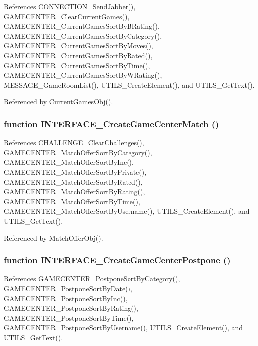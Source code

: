 References CONNECTION\_\-SendJabber(), GAMECENTER\_\-ClearCurrentGames(), GAMECENTER\_\-CurrentGamesSortByBRating(), GAMECENTER\_\-CurrentGamesSortByCategory(), GAMECENTER\_\-CurrentGamesSortByMoves(), GAMECENTER\_\-CurrentGamesSortByRated(), GAMECENTER\_\-CurrentGamesSortByTime(), GAMECENTER\_\-CurrentGamesSortByWRating(), MESSAGE\_\-GameRoomList(), UTILS\_\-CreateElement(), and UTILS\_\-GetText().

Referenced by CurrentGamesObj().
\subsubsection[INTERFACE\_\-CreateGameCenterMatch]{\setlength{\rightskip}{0pt plus 5cm}function INTERFACE\_\-CreateGameCenterMatch ()}\label{interface_2gamecenter_8js_cd46b547d2069b8e99477be9599a0fbb}




References CHALLENGE\_\-ClearChallenges(), GAMECENTER\_\-MatchOfferSortByCategory(), GAMECENTER\_\-MatchOfferSortByInc(), GAMECENTER\_\-MatchOfferSortByPrivate(), GAMECENTER\_\-MatchOfferSortByRated(), GAMECENTER\_\-MatchOfferSortByRating(), GAMECENTER\_\-MatchOfferSortByTime(), GAMECENTER\_\-MatchOfferSortByUsername(), UTILS\_\-CreateElement(), and UTILS\_\-GetText().

Referenced by MatchOfferObj().
\subsubsection[INTERFACE\_\-CreateGameCenterPostpone]{\setlength{\rightskip}{0pt plus 5cm}function INTERFACE\_\-CreateGameCenterPostpone ()}\label{interface_2gamecenter_8js_12adac32e00e7303d9be30b584ba6e70}




References GAMECENTER\_\-PostponeSortByCategory(), GAMECENTER\_\-PostponeSortByDate(), GAMECENTER\_\-PostponeSortByInc(), GAMECENTER\_\-PostponeSortByRating(), GAMECENTER\_\-PostponeSortByTime(), GAMECENTER\_\-PostponeSortByUsername(), UTILS\_\-CreateElement(), and UTILS\_\-GetText().

